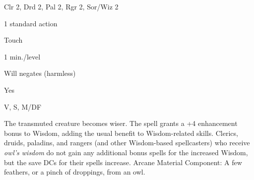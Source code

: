 
\begin{description*}
\item[Level:] Clr 2, Drd 2, Pal 2, Rgr 2, Sor/Wiz 2
\item[Casting Time:] 1 standard action
\item[Range:] Touch
\item[Duration:] 1 min./level
\item[Saving Throw:] Will negates (harmless)
\item[Spell Resistance:] Yes
\item[Components:] V, S, M/DF
\end{description*}

The transmuted creature becomes wiser. The spell grants a +4 enhancement bonus
to Wisdom, adding the usual benefit to Wisdom-related skills. Clerics, druids,
paladins, and rangers (and other Wisdom-based spellcasters) who receive \textit{owl's
wisdom} do not gain any additional bonus spells for the increased Wisdom, but the
save DCs for their spells increase.
Arcane Material Component: A few feathers, or a pinch of droppings, from
an owl.